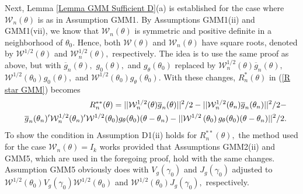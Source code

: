 \documentclass[12pt,titlepage,final,oneside,letterpaper]{article}
\begin{document}
Next, Lemma \ref{Lemma GMM Sufficient D}(a) is established for the case
where $\mathcal{W}_{n}(\theta )$ is as in Assumption GMM1. By Assumptions
GMM1(ii) and GMM1(vii), we know that $\mathcal{W}_{n}(\theta )$ is symmetric
and positive definite in a neighborhood of $\theta _{0}.$ Hence, both $%
\mathcal{W}(\theta )$ and $\mathcal{W}_{n}(\theta )$ have square roots,
denoted by $\mathcal{W}^{1/2}(\theta )$ and $\mathcal{W}_{n}^{1/2}(\theta ),$
respectively$.$ The idea is to use the same proof as above, but with $%
\overline{g}_{n}(\theta ),$ $g_{0}(\theta ),$ and $g_{\theta }(\theta _{0})$
replaced by $\mathcal{W}_{n}^{1/2}(\theta )\overline{g}_{n}(\theta ),$ $%
\mathcal{W}^{1/2}(\theta _{0})g_{0}(\theta ),$ and $\mathcal{W}^{1/2}(\theta
_{0})g_{\theta }(\theta _{0}).$ With these changes, $R_{n}^{\ast }(\theta )$
in (\ref{R star GMM}) becomes%
\begin{eqnarray}
&&R_{n}^{\ast \ast }(\theta )\overset{}{=}||\mathcal{W}_{n}^{1/2}(\theta )%
\overline{g}_{n}(\theta )||^{2}/2-||\mathcal{W}_{n}^{1/2}(\theta _{n})%
\overline{g}_{n}(\theta _{n})||^{2}/2-  \label{R star star replace} \\
&&\overline{g}_{n}(\theta _{n})^{\prime }\mathcal{W}_{n}^{1/2}(\theta
_{n})^{\prime }\mathcal{W}^{1/2}(\theta _{0})g_{\theta }(\theta _{0})(\theta
-\theta _{n})-||\mathcal{W}^{1/2}\left( \theta _{0}\right) g_{\theta
}(\theta _{0})(\theta -\theta _{n})||^{2}/2.  \notag
\end{eqnarray}%
To show the condition in Assumption D1(ii) holds for $R_{n}^{\ast \ast
}\left( \theta \right) ,$ the method used for the case $\mathcal{W}%
_{n}\left( \theta \right) =I_{k}$ works provided that Assumptions GMM2(ii)
and GMM5, which are used in the foregoing proof, hold with the same changes.
Assumption GMM5 obviously does with $V_{g}\left( \gamma _{0}\right) $ and $%
J_{g}\left( \gamma _{0}\right) $ adjusted to $\mathcal{W}^{1/2}\left( \theta
_{0}\right) V_{g}\left( \gamma _{0}\right) \mathcal{W}^{1/2}\left( \theta
_{0}\right) $ and $\mathcal{W}^{1/2}\left( \theta _{0}\right) J_{g}\left(
\gamma _{0}\right) ,$ respectively.
\end{document}
